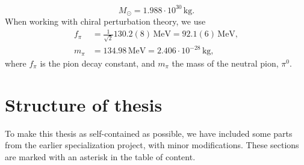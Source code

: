 %
\begin{equation}
    \label{solar mass}
    M_\odot = 1.988 \cdot 10^{30} \, \text{kg}.
\end{equation}
%
When working with chiral perturbation theory, we use~\autocite{particledatagroupReviewParticlePhysics2020}
%
\begin{align}
    \label{pion decay constant}
    f_\pi & = \frac{1}{\sqrt{2}}130.2 (8) \, \text{MeV} = 92.1(6) \, \text{MeV}, \\
    \label{pion mass}
    m_\pi & = 134.98 \, \text{MeV} = 2.406 \cdot 10^{-28}\, \text{kg},
\end{align}
%
where $f_\pi$ is the pion decay constant, and $m_\pi$ the mass of the neutral pion, $\pi^0$.

\section{Structure of thesis}

To make this thesis as self-contained as possible, we have included some parts from the earlier specialization project, with minor modifications.
These sections are marked with an asterisk in the table of content.
